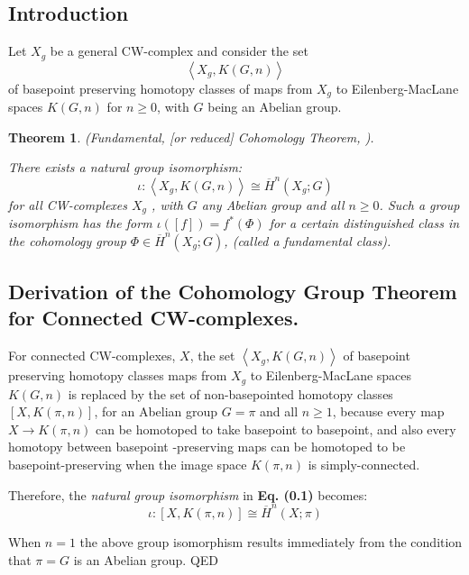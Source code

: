 \documentclass[12pt]{article}
\theoremstyle{plain}
\newtheorem{theorem}{Theorem}[section]
\theoremstyle{definition}
\theoremstyle{plain}
\numberwithin{equation}{section}
\renewcommand{\geq}{{\geqslant}}
\begin{document}
\subsection{Introduction}


 Let $X_g$ be a general CW-complex and consider the set 
$$\left\langle{X_g, K(G,n)}\right\rangle $$ 
of basepoint preserving homotopy classes of maps from $X_g$ to Eilenberg-MacLane spaces $K(G, n)$ for $n \geq 0 $, with $G$ being an Abelian group. 

\begin{theorem}(Fundamental, [or reduced] Cohomology Theorem, \cite{AllenHatcher2k1}).
  
 There exists a natural group isomorphism:
\begin{equation}
\iota : \left\langle{X_g, K(G,n)}\right\rangle \cong \overline{H}^n (X_g;G)
\end{equation}
 for all CW-complexes $X_g$ , with $G$ any Abelian group and all $n \geq 0$. Such a group isomorphism
has the form $\iota ([f]) = f^*(\Phi)$ for a certain distinguished class in the cohomology group
$\Phi \in \overline{H}^n (X_g;G)$, (called a \emph{fundamental class}). 

\end{theorem}

\subsection{Derivation of the Cohomology Group Theorem for Connected CW-complexes.}
 For connected CW-complexes, $X$, the set $\left\langle{X_g, K(G,n)}\right\rangle$ of basepoint preserving homotopy classes maps from $X_g$ to Eilenberg-MacLane spaces $K(G, n)$ is replaced by the set of non-basepointed homotopy classes $[X, K(\pi,n)]$, for an Abelian group $G = \pi$ and all $n \geq 1$, because every map $X \to K(\pi,n)$ can be homotoped to take basepoint to basepoint, and also every  homotopy between basepoint -preserving maps can be homotoped to be basepoint-preserving when the image space $K(\pi,n)$ is simply-connected. 

 Therefore, the {\em natural group isomorphism} in {\bf Eq. (0.1)} becomes:
\begin{equation}
\iota : [X, K(\pi,n)] \cong \overline{H}^n (X;\pi)
\end{equation}

When $n =1$ the above group isomorphism results immediately from the condition that 
$\pi = G$ is an Abelian group. QED 
\end{document}
